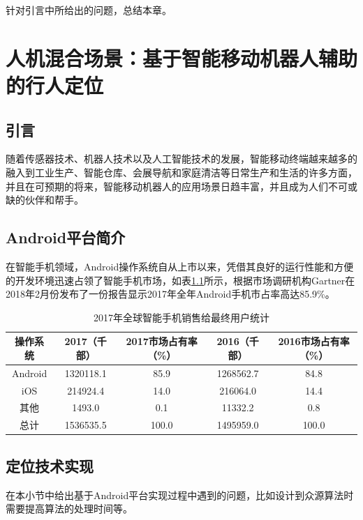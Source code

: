 针对引言中所给出的问题，总结本章。




\chapter{人机混合场景：基于智能移动机器人辅助的行人定位}

\section{引言}
随着传感器技术、机器人技术以及人工智能技术的发展，智能移动终端越来越多的融入到工业生产、智能仓库、会展导航和家庭清洁等日常生产和生活的许多方面，并且在可预期的将来，智能移动机器人的应用场景日趋丰富，并且成为人们不可或缺的伙伴和帮手。

\section{Android平台简介}

在智能手机领域，Android操作系统自从上市以来，凭借其良好的运行性能和方便的开发环境迅速占领了智能手机市场，如表\ref{tab-61}所示，根据市场调研机构Gartner在2018年2月份发布了一份报告显示2017年全年Android手机市占率高达85.9\%\cite{gartner-smartphone-2017}。


\begin{table} [thb]
	\caption{2017年全球智能手机销售给最终用户统计}\label{tab-61}
	\small
	\centering
	{
		\begin{tabular}{c c c c c}
			\toprule
			操作系统 & 2017（千部） & 2017市场占有率（\%） & 2016（千部） & 2016市场占有率（\%）\\
			\midrule
			Android & 1320118.1 & 85.9 & 1268562.7 & 84.8\\
			iOS & 214924.4 & 14.0 & 216064.0 & 14.4\\
			其他 & 1493.0 & 0.1 & 11332.2 & 0.8\\
			总计 & 1536535.5 & 100.0 & 1495959.0 & 100.0\\			
			\bottomrule
		\end{tabular}
	}
\end{table}


\section{定位技术实现}

在本小节中给出基于Android平台实现过程中遇到的问题，比如设计到众源算法时需要提高算法的处理时间等。

